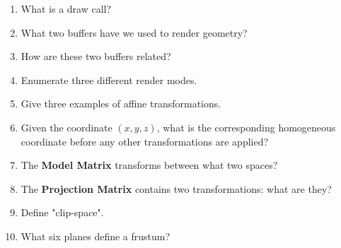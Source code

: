 \documentclass[11pt]{article}
\begin{document}
\begin{enumerate}[start=0]
\item What is a draw call?
\vspace*{25px}

\item What two buffers have we used to render geometry?
\vspace*{25px}

\item How are these two buffers related?
\vspace*{25px}

\item Enumerate three different render modes.
\vspace*{25px}

\item Give three examples of affine transformations.
\vspace*{25px}

\item Given the coordinate $(x, y, z)$, what is the corresponding homogeneous coordinate before any other transformations are applied?
\vspace*{25px}

\item The \textbf{Model Matrix} transforms between what two spaces?
\vspace*{25px}

\item The \textbf{Projection Matrix} contains two transformations: what are they?
\vspace*{25px}

\item Define "clip-space".
\vspace*{25px}

\item What six planes define a frustum?
\vspace*{25px}

\end{enumerate}
\end{document}
